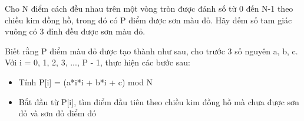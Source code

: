 Cho N điểm cách đều nhau trên một vòng tròn được đánh số từ 0 đến N-1 theo chiều kim đồng hồ, trong đó có P điểm được sơn màu đỏ. Hãy đếm số tam giác vuông có 3 đỉnh đều được sơn màu đỏ.  

   Biết rằng P điểm màu đỏ được tạo thành như sau, cho trước 3 số nguyên a, b, c. Với i = 0, 1, 2, 3, ..., P - 1, thực hiện các bước sau:  
\begin{itemize}
	\item     Tính P[i] = (a*i*i + b*i + c) mod N   
	\item     Bắt đầu từ P[i], tìm điểm đầu tiên theo chiều kim đồng hồ mà chưa được sơn đỏ và sơn đỏ điểm đó   
\end{itemize}